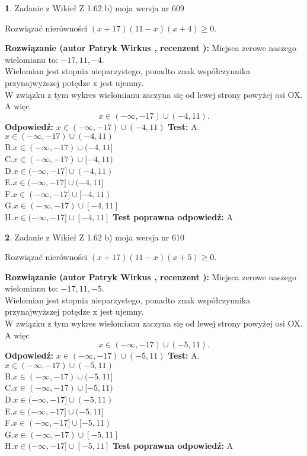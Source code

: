 \documentclass[12pt, a4paper]{article}
\theoremstyle{definition} %
\newtheorem{zad}{}
\newcommand{\zadStart}[1]{\begin{zad}#1\newline}
\newcommand{\zadStop}{\end{zad}}
\newcommand{\rozwStart}[2]{\noindent \textbf{Rozwiązanie (autor #1 , recenzent #2): }\newline}
\newcommand{\rozwStop}{\newline}
\newcommand{\odpStart}{\noindent \textbf{Odpowiedź:}\newline}
\newcommand{\odpStop}{\newline}
\newcommand{\testStart}{\noindent \textbf{Test:}\newline}
\newcommand{\testStop}{\newline}
\newcommand{\kluczStart}{\noindent \textbf{Test poprawna odpowiedź:}\newline}
\newcommand{\kluczStop}{\newline}
\begin{document}
\zadStart{Zadanie z Wikieł Z 1.62 b) moja wersja nr 609}

Rozwiązać nierówności $(x+17)(11-x)(x+4)\ge0$.
\zadStop
\rozwStart{Patryk Wirkus}{}
Miejsca zerowe naszego wielomianu to: $-17, 11, -4$.\\
Wielomian jest stopnia nieparzystego, ponadto znak współczynnika przy\linebreak najwyższej potędze x jest ujemny.\\ W związku z tym wykres wielomianu zaczyna się od lewej strony powyżej osi OX. A więc $$x \in (-\infty,-17) \cup (-4,11).$$
\rozwStop
\odpStart
$x \in (-\infty,-17) \cup (-4,11)$
\odpStop
\testStart
A.$x \in (-\infty,-17) \cup (-4,11)$\\
B.$x \in (-\infty,-17) \cup (-4,11]$\\
C.$x \in (-\infty,-17) \cup [-4,11)$\\
D.$x \in (-\infty,-17] \cup (-4,11)$\\
E.$x \in (-\infty,-17] \cup (-4,11]$\\
F.$x \in (-\infty,-17] \cup [-4,11)$\\
G.$x \in (-\infty,-17) \cup [-4,11]$\\
H.$x \in (-\infty,-17] \cup [-4,11]$
\testStop
\kluczStart
A
\kluczStop



\zadStart{Zadanie z Wikieł Z 1.62 b) moja wersja nr 610}

Rozwiązać nierówności $(x+17)(11-x)(x+5)\ge0$.
\zadStop
\rozwStart{Patryk Wirkus}{}
Miejsca zerowe naszego wielomianu to: $-17, 11, -5$.\\
Wielomian jest stopnia nieparzystego, ponadto znak współczynnika przy\linebreak najwyższej potędze x jest ujemny.\\ W związku z tym wykres wielomianu zaczyna się od lewej strony powyżej osi OX. A więc $$x \in (-\infty,-17) \cup (-5,11).$$
\rozwStop
\odpStart
$x \in (-\infty,-17) \cup (-5,11)$
\odpStop
\testStart
A.$x \in (-\infty,-17) \cup (-5,11)$\\
B.$x \in (-\infty,-17) \cup (-5,11]$\\
C.$x \in (-\infty,-17) \cup [-5,11)$\\
D.$x \in (-\infty,-17] \cup (-5,11)$\\
E.$x \in (-\infty,-17] \cup (-5,11]$\\
F.$x \in (-\infty,-17] \cup [-5,11)$\\
G.$x \in (-\infty,-17) \cup [-5,11]$\\
H.$x \in (-\infty,-17] \cup [-5,11]$
\testStop
\kluczStart
A
\kluczStop
\end{document}
